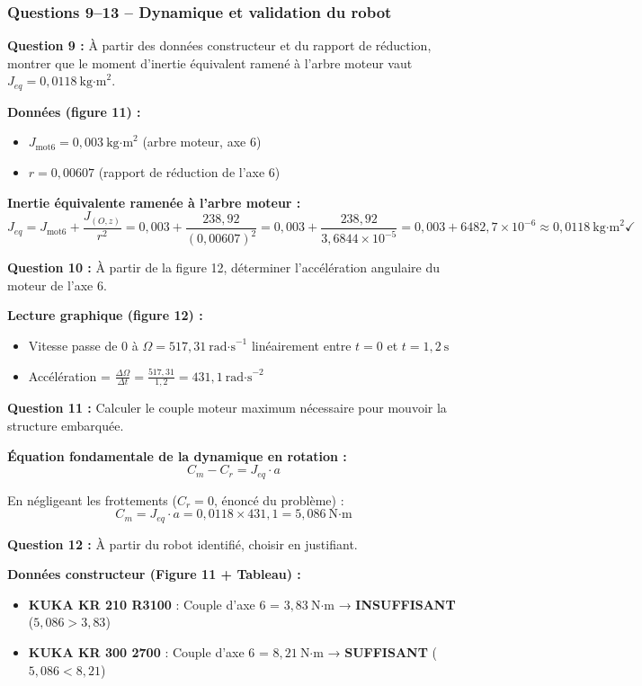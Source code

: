 \documentclass[12pt,a4paper,twoside]{article}
\begin{document}
\subsubsection{Questions 9--13 -- Dynamique et validation du robot}

\begin{correction}
  \textbf{Question 9 :} À partir des données constructeur et du rapport de réduction, montrer que le moment d'inertie équivalent ramené à l'arbre moteur vaut $J_{eq} = 0,0118~\text{kg·m}^2$.

  \textbf{Données (figure 11) :}
  \begin{itemize}
    \item $J_{\text{mot6}} = 0,003~\text{kg·m}^2$ (arbre moteur, axe 6)
    \item $r = 0,00607$ (rapport de réduction de l'axe 6)
  \end{itemize}

  \textbf{Inertie équivalente ramenée à l'arbre moteur :}
  \[
    J_{eq} = J_{\text{mot6}} + \frac{J_{(O,z)}}{r^2} = 0,003 + \frac{238,92}{(0,00607)^2} = 0,003 + \frac{238,92}{3,6844 \times 10^{-5}} = 0,003 + 6482,7 \times 10^{-6} \approx 0,0118~\text{kg·m}^2 \checkmark
  \]

  \textbf{Question 10 :} À partir de la figure 12, déterminer l'accélération angulaire du moteur de l'axe 6.

  \textbf{Lecture graphique (figure 12) :}
  \begin{itemize}
    \item Vitesse passe de 0 à $\Omega = 517,31~\text{rad·s}^{-1}$ linéairement entre $t=0$ et $t = 1,2~\text{s}$
    \item Accélération = $\frac{\Delta \Omega}{\Delta t} = \frac{517,31}{1,2} = 431,1~\text{rad·s}^{-2}$
  \end{itemize}

  \textbf{Question 11 :} Calculer le couple moteur maximum nécessaire pour mouvoir la structure embarquée.

  \textbf{Équation fondamentale de la dynamique en rotation :}
  \[
    C_m - C_r = J_{eq} \cdot a
  \]

  En négligeant les frottements ($C_r = 0$, énoncé du problème) :
  \[
    C_m = J_{eq} \cdot a = 0,0118 \times 431,1 = 5,086~\text{N·m}
  \]

  \textbf{Question 12 :} À partir du robot identifié, choisir en justifiant.

  \textbf{Données constructeur (Figure 11 + Tableau) :}
  \begin{itemize}
    \item \textbf{KUKA KR 210 R3100} : Couple d'axe 6 = $3,83~\text{N·m}$ → \textbf{INSUFFISANT} ($5,086 > 3,83$)
    \item \textbf{KUKA KR 300 2700} : Couple d'axe 6 = $8,21~\text{N·m}$ → \textbf{SUFFISANT} ($5,086 < 8,21$)
  \end{itemize}


\end{correction}
\end{document}
